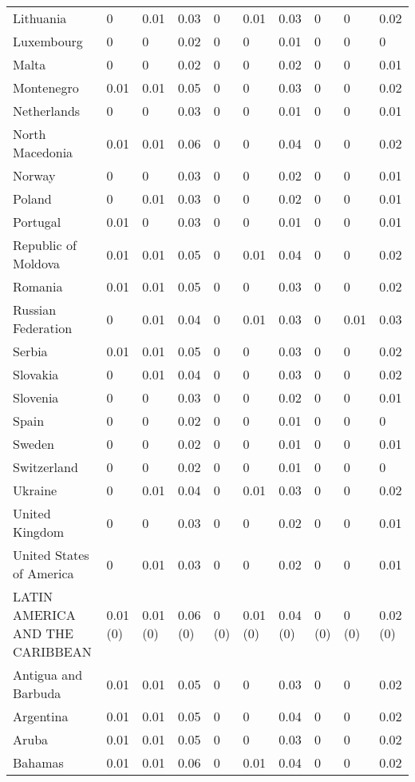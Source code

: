 \begin{longtable}[t]{llllllllll}
Lithuania & 0 & 0.01 & 0.03 & 0 & 0.01 & 0.03 & 0 & 0 & 0.02\\
Luxembourg & 0 & 0 & 0.02 & 0 & 0 & 0.01 & 0 & 0 & 0\\
Malta & 0 & 0 & 0.02 & 0 & 0 & 0.02 & 0 & 0 & 0.01\\
Montenegro & 0.01 & 0.01 & 0.05 & 0 & 0 & 0.03 & 0 & 0 & 0.02\\
Netherlands & 0 & 0 & 0.03 & 0 & 0 & 0.01 & 0 & 0 & 0.01\\
North Macedonia & 0.01 & 0.01 & 0.06 & 0 & 0 & 0.04 & 0 & 0 & 0.02\\
Norway & 0 & 0 & 0.03 & 0 & 0 & 0.02 & 0 & 0 & 0.01\\
Poland & 0 & 0.01 & 0.03 & 0 & 0 & 0.02 & 0 & 0 & 0.01\\
Portugal & 0.01 & 0 & 0.03 & 0 & 0 & 0.01 & 0 & 0 & 0.01\\
Republic of Moldova & 0.01 & 0.01 & 0.05 & 0 & 0.01 & 0.04 & 0 & 0 & 0.02\\
Romania & 0.01 & 0.01 & 0.05 & 0 & 0 & 0.03 & 0 & 0 & 0.02\\
Russian Federation & 0 & 0.01 & 0.04 & 0 & 0.01 & 0.03 & 0 & 0.01 & 0.03\\
Serbia & 0.01 & 0.01 & 0.05 & 0 & 0 & 0.03 & 0 & 0 & 0.02\\
Slovakia & 0 & 0.01 & 0.04 & 0 & 0 & 0.03 & 0 & 0 & 0.02\\
Slovenia & 0 & 0 & 0.03 & 0 & 0 & 0.02 & 0 & 0 & 0.01\\
Spain & 0 & 0 & 0.02 & 0 & 0 & 0.01 & 0 & 0 & 0\\
Sweden & 0 & 0 & 0.02 & 0 & 0 & 0.01 & 0 & 0 & 0.01\\
Switzerland & 0 & 0 & 0.02 & 0 & 0 & 0.01 & 0 & 0 & 0\\
Ukraine & 0 & 0.01 & 0.04 & 0 & 0.01 & 0.03 & 0 & 0 & 0.02\\
United Kingdom & 0 & 0 & 0.03 & 0 & 0 & 0.02 & 0 & 0 & 0.01\\
United States of America & 0 & 0.01 & 0.03 & 0 & 0 & 0.02 & 0 & 0 & 0.01\\
LATIN AMERICA AND THE CARIBBEAN & 0.01 (0) & 0.01 (0) & 0.06 (0) & 0 (0) & 0.01 (0) & 0.04 (0) & 0 (0) & 0 (0) & 0.02 (0)\\
Antigua and Barbuda & 0.01 & 0.01 & 0.05 & 0 & 0 & 0.03 & 0 & 0 & 0.02\\
Argentina & 0.01 & 0.01 & 0.05 & 0 & 0 & 0.04 & 0 & 0 & 0.02\\
Aruba & 0.01 & 0.01 & 0.05 & 0 & 0 & 0.03 & 0 & 0 & 0.02\\
Bahamas & 0.01 & 0.01 & 0.06 & 0 & 0.01 & 0.04 & 0 & 0 & 0.02\\

\end{longtable}
